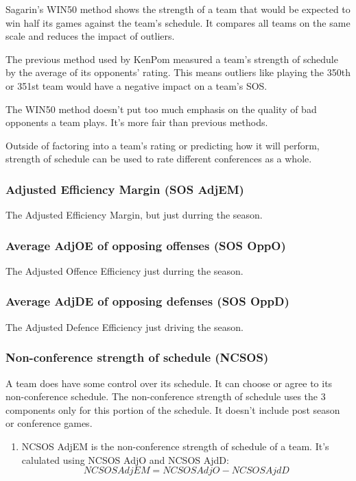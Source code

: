\documentclass[
10pt, %
a4paper, %
oneside, %
headinclude,footinclude, %
BCOR5mm, %
]{scrartcl}
\begin{document}
Sagarin's WIN50 method shows the strength of a team that would be expected to win half its games against the team's schedule. It compares all teams on the same scale and reduces the impact of outliers.

The previous method used by KenPom measured a team's strength of schedule by the average of its opponents' rating. This means outliers like playing the 350th or 351st team would have a negative impact on a team's SOS.

The WIN50 method doesn't put too much emphasis on the quality of bad opponents a team plays. It's more fair than previous methods.

Outside of factoring into a team's rating or predicting how it will perform, strength of schedule can be used to rate different conferences as a whole.\cite{sos}

\subsubsection{Adjusted Efficiency Margin (SOS AdjEM)}
The Adjusted Efficiency Margin, but just durring the season.

\subsubsection{Average AdjOE of opposing offenses (SOS OppO)}
The Adjusted Offence Efficiency just durring the season.

\subsubsection{Average AdjDE of opposing defenses (SOS OppD)}
The Adjusted Defence Efficiency just driving the season.

\subsubsection{Non-conference strength of schedule (NCSOS)}
A team does have some control over its schedule. It can choose or agree to its non-conference schedule.
The non-conference strength of schedule uses the 3 components only for this portion of the schedule. It doesn't include post season or conference games.

\begin{enumerate}
\item NCSOS AdjEM is the non-conference strength of schedule of a team. It's calulated using NCSOS AdjO and NCSOS AjdD:
\[NCSOS AdjEM = NCSOS AdjO - NCSOS AjdD\]
\end{enumerate}
\end{document}
